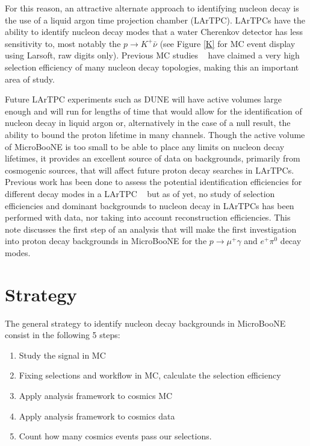 \documentclass[a4paper, 10pt]{article}
\begin{document}
For this reason, an attractive alternate approach to identifying nucleon decay is the use of a liquid argon time projection chamber (LArTPC). LArTPCs have the ability to identify nucleon decay modes that a water Cherenkov detector has less sensitivity to, most notably the $p\rightarrow K^{+} \bar{\nu}$ (see Figure \ref{K} for MC event display using Larsoft, raw digits only).  Previous MC studies ~\cite{Bueno:2007um} have claimed a very high selection efficiency of many nucleon decay topologies, making this an important area of study.

Future LArTPC experiments such as DUNE will have active volumes large enough and will run for lengths of time that would allow for the identification of nucleon decay in liquid argon or, alternatively in the case of a null result, the ability to bound the proton lifetime in many channels. Though the active volume of MicroBooNE is too small to be able to place any limits on nucleon decay lifetimes, it provides an excellent source of data on backgrounds, primarily from cosmogenic sources, that will affect future proton decay searches in LArTPCs.
Previous work has been done to assess the potential identification efficiencies for different decay modes in a LArTPC ~\cite{Bueno:2007um} but as of yet, no study of selection efficiencies and dominant backgrounds to nucleon decay in LArTPCs has been performed with data, nor taking into account reconstruction efficiencies. This note discusses the first step of an analysis that will make the first investigation into proton decay backgrounds in MicroBooNE for the $p \rightarrow \mu^{+} \gamma$ and $e^{+} \pi^{0}$  decay modes.


\section{Strategy}
The general strategy to identify nucleon decay backgrounds in MicroBooNE consist in the following 5 steps: 
\begin{enumerate}[topsep=10pt,itemsep=-1ex,partopsep=10pt,parsep=1ex]
\item Study the signal in MC
\item Fixing selections and workflow in MC, calculate the selection efficiency
\item Apply analysis framework to cosmics MC 
\item Apply analysis framework to cosmics data
\item Count how many cosmics events pass our selections.
\end{enumerate}
\end{document}
